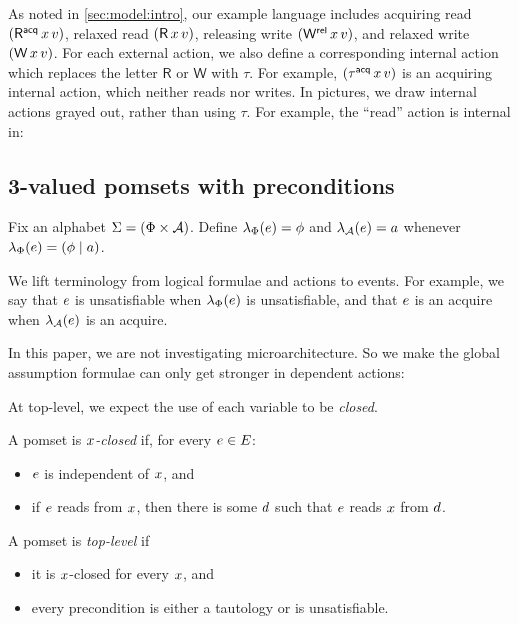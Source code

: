 As noted in \textsection\ref{sec:model:intro}, our example language includes acquiring
read $(\DRAcq{\aLoc}{\aVal})$, relaxed read $(\DR{\aLoc}{\aVal})$, releasing
write $(\DWRel{\aLoc}{\aVal})$, and relaxed write $(\DW{\aLoc}{\aVal})$.
For each external action, we also define a corresponding internal action
which replaces the letter $\mathsf{R}$ or $\mathsf{W}$ with $\tau$.
For example, $(\iDRAcq{\aLoc}{\aVal})$ is an acquiring internal action, which
neither reads nor writes. In pictures, we draw internal actions grayed out,
rather than using $\tau$.  For example, the ``read'' action is internal in:
\begin{tikzdisplay}[node distance=1em]
\end{tikzdisplay}



\subsection{3-valued pomsets with preconditions}

Fix an alphabet $\Sigma=(\Phi\times\mathcal{A})$.
Define %
$\lambda_{\Phi}(e)=\phi$ and $\lambda_{\mathcal{A}}(e)=a$ whenever
$\lambda_{\Phi}(e)=(\phi\mid a)$.

We lift terminology from logical formulae and actions to events. For example,
we say that $e$ is unsatisfiable when $\lambda_{\Phi}(e)$ is unsatisfiable,
and that $e$ is an acquire when $\lambda_{\mathcal{A}}(e)$ is an acquire.



In this paper, we are not investigating microarchitecture.  So we make the
global assumption formulae can only get stronger in dependent actions:

At top-level, we expect the use of each variable to be \emph{closed}.
\begin{definition}
\label{def:x-closed}
  A pomset is \emph{$x$-closed} if, for every $e\in E$:
  \begin{itemize}
  \item $e$ is independent of $x$, and
  \item if $e$ reads from $x$, then there is some $d$ such that
    $e$ reads $x$ from $d$.
  \end{itemize}
  A pomset is \emph{top-level} if
  \begin{itemize}
  \item it is $x$-closed for every $x$, and
  \item every precondition is either a tautology or is unsatisfiable.
  \end{itemize}
\end{definition}

